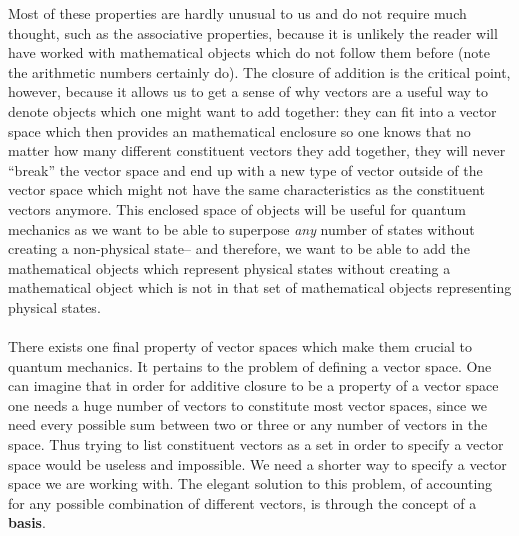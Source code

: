 Most of these properties are hardly unusual to us and do not require much thought, such as the associative properties, because it is unlikely the reader will have worked with mathematical objects which do not follow them before (note the arithmetic numbers certainly do). The closure of addition is the critical point, however, because it allows us to get a sense of why vectors are a useful way to denote objects which one might want to add together: they can fit into a vector space which then provides an mathematical enclosure so one knows that no matter how many different constituent vectors they add together, they will never ``break'' the vector space and end up with a new type of vector outside of the vector space which might not have the same characteristics as the constituent vectors anymore. This enclosed space of objects will be useful for quantum mechanics as we want to be able to superpose \textit{any} number of states without creating a non-physical state-- and therefore, we want to be able to add the mathematical objects which represent physical states without creating a mathematical object which is not in that set of mathematical objects representing physical states.
\\\\
There exists one final property of vector spaces which make them crucial to quantum mechanics. It pertains to the problem of defining a vector space. One can imagine that in order for additive closure to be a property of a vector space one needs a huge number of vectors to constitute most vector spaces, since we need every possible sum between two or three or any number of vectors in the space. Thus trying to list constituent vectors as a set in order to specify a vector space would be useless and impossible. We need a shorter way to specify a vector space we are working with. The elegant solution to this problem, of accounting for any possible combination of different vectors, is through the concept of a \textbf{basis}.
